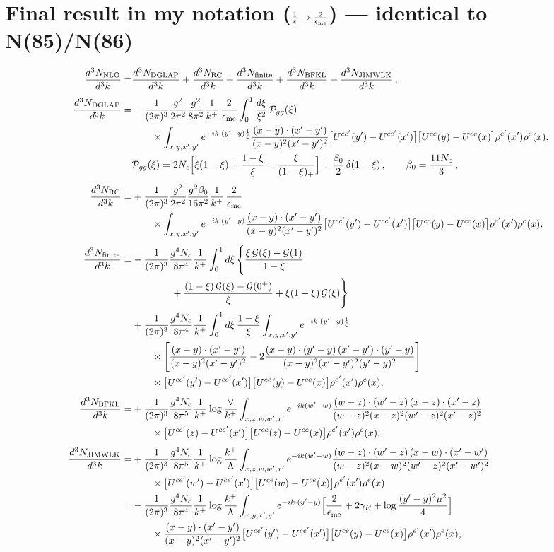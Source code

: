 \documentclass[10pt]{article}
\numberwithin{equation}{section}
\newcommand{\Wop}[2]{\big[U^{ce'}(#2)-U^{ce'}(x')\big]\big[U^{ce}(#1)-U^{ce}(x)\big]\rho^{e'}(x')\rho^{e}(x)}
\newcommand{\Kx}[2]{\frac{(x-#1)\cdot(x'-#2)}{(x-#1)^{2}(x'-#2)^{2}}}
\begin{document}
\section{Final result in my notation ($\frac{1}{\epsilon}\to\frac{2}{\epsilon_{\rm me}}$) --- identical to N(85)/N(86)}
\begin{align}
\frac{d^{3}N_{\rm NLO}}{d^{3}k}=&\frac{d^{3}N_{\rm DGLAP}}{d^{3}k}+\frac{d^{3}N_{\rm RC}}{d^{3}k}+\frac{d^{3}N_{\rm finite}}{d^{3}k}+\frac{d^{3}N_{\rm BFKL}}{d^{3}k}+\frac{d^{3}N_{\rm JIMWLK}}{d^{3}k}\,,\\[4pt]
\frac{d^{3}N_{\rm DGLAP}}{d^{3}k}=&-\frac{1}{(2\pi)^{3}}\frac{g^{2}}{2\pi^{2}}\frac{g^{2}}{8\pi^{2}}\frac{1}{k^{+}}\,\frac{2}{\epsilon_{\rm me}}\int_{0}^{1}\frac{d\xi}{\xi^{2}}\,\mathcal P_{gg}(\xi)\notag\\
&\qquad\times\int_{x,y,x',y'}e^{-ik\cdot(y'-y)\frac{1}{\xi}}\Kx{y}{y'}\Wop{y}{y'},\\
&\mathcal P_{gg}(\xi)=2N_{c}\Big[\xi(1-\xi)+\frac{1-\xi}{\xi}+\frac{\xi}{(1-\xi)_{+}}\Big]+\frac{\beta_{0}}{2}\,\delta(1-\xi)\,,\qquad\beta_{0}=\frac{11N_{c}}{3}\,,\notag\\[4pt]
\frac{d^{3}N_{\rm RC}}{d^{3}k}=&+\frac{1}{(2\pi)^{3}}\frac{g^{2}}{2\pi^{2}}\frac{g^{2}\beta_{0}}{16\pi^{2}}\frac{1}{k^{+}}\,\frac{2}{\epsilon_{\rm me}}\notag\\
&\qquad\times\int_{x,y,x',y'}e^{-ik\cdot(y'-y)}\Kx{y}{y'}\Wop{y}{y'},\\[4pt]
\frac{d^{3}N_{\rm finite}}{d^{3}k}=&-\frac{1}{(2\pi)^{3}}\frac{g^{4}N_{c}}{8\pi^{4}}\frac{1}{k^{+}}\int_{0}^{1}d\xi\,\Bigg\{\frac{\xi\,\mathcal G(\xi)-\mathcal G(1)}{1-\xi}\notag\\
&\qquad\qquad+\frac{(1-\xi)\,\mathcal G(\xi)-\mathcal G(0^+)}{\xi}+\xi(1-\xi)\,\mathcal G(\xi)\Bigg\}\notag\\
&+\frac{1}{(2\pi)^{3}}\frac{g^{4}N_{c}}{8\pi^{4}}\frac{1}{k^{+}}\int_{0}^{1}d\xi\,\frac{1-\xi}{\xi}\int_{x,y,x',y'}e^{-ik\cdot(y'-y)\frac{1}{\xi}}\notag\\
&\qquad\times\Bigg[\Kx{y}{y'}-2\frac{(x-y)\cdot(y'-y)\,(x'-y')\cdot(y'-y)}{(x-y)^{2}(x'-y')^{2}(y'-y)^{2}}\Bigg]\notag\\
&\qquad\times\Wop{y}{y'},\\[4pt]
\frac{d^{3}N_{\rm BFKL}}{d^{3}k}=&+\frac{1}{(2\pi)^{3}}\frac{g^{4}N_{c}}{8\pi^{5}}\frac{1}{k^{+}}\log\frac{\vee}{k^{+}}\int_{x,z,w,w',x'}e^{-ik(w'-w)}\frac{(w-z)\cdot(w'-z)\,(x-z)\cdot(x'-z)}{(w-z)^{2}(x-z)^{2}(w'-z)^{2}(x'-z)^{2}}\notag\\
&\qquad\times\Wop{z}{z},\\[4pt]
\frac{d^{3}N_{\rm JIMWLK}}{d^{3}k}=&+\frac{1}{(2\pi)^{3}}\frac{g^{4}N_{c}}{8\pi^{5}}\frac{1}{k^{+}}\log\frac{k^{+}}{\Lambda}\int_{x,z,w,w',x'}e^{-ik(w'-w)}\frac{(w-z)\cdot(w'-z)\,(x-w)\cdot(x'-w')}{(w-z)^{2}(x-w)^{2}(w'-z)^{2}(x'-w')^{2}}\notag\\
&\qquad\times\Wop{w}{w'}\notag\\
=&-\frac{1}{(2\pi)^{3}}\frac{g^{4}N_{c}}{8\pi^{4}}\frac{1}{k^{+}}\log\frac{k^{+}}{\Lambda}\int_{x,y,x',y'}e^{-ik\cdot(y'-y)}\Big[\frac{2}{\epsilon_{\rm me}}+2\gamma_{E}+\log\frac{(y'-y)^{2}\mu^{2}}{4}\Big]\notag\\
&\qquad\times\Kx{y}{y'}\Wop{y}{y'},
\end{align}
\end{document}
